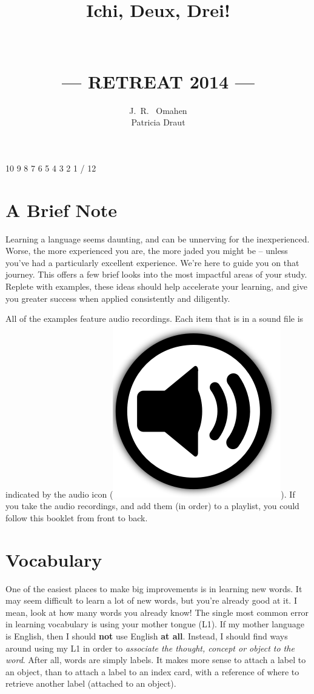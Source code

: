 \documentclass[letterpaper,twoside,openright,11pt,final]{memoir}
\title{
\vspace{24pt}
\large{\textbf{Ichi, Deux, Drei!} }\\
\HUGE{Learning}\\ 
\HUGE{a new language}\\
\vfill
\large{--- RETREAT 2014 ---}
\vfill
}
\author{J.~R.~ Omahen\\
Patricia Draut}
\date{}
\newcommand{\audio}{{\includegraphics[scale=0.05]{audio}}}
\begin{document}
\frontmatter

\thispagestyle{empty}
\begin{center}
\thetitle
\theauthor
\vfill
\end{center}
\newpage

\thispagestyle{empty}
\ccby

\vspace{\fill}
\begin{flushleft}\normalsize

10 9 8 7 6 5 4 3 2 1 / 12 \\
\end{flushleft}

\cleardoublepage
\frontmatter
\chapter{A Brief Note}

Learning a language seems daunting, and can be unnerving for the inexperienced. Worse, the more experienced you are, the more jaded you might be -- unless you've had a particularly excellent experience. We're here to guide you on that journey. This offers a few brief looks into the most impactful areas of your study. Replete with examples, these ideas should help accelerate your learning, and give you greater success when applied consistently and diligently.

All of the examples feature audio recordings. Each item that is in a sound file is indicated by the audio icon (\audio{}). If you take the audio recordings, and add them (in order) to a playlist, you could follow this booklet from front to back.



\mainmatter
\charis
\chapter{Vocabulary}

One of the easiest places to make big improvements is in learning new words. It may seem difficult to learn a lot of new words, but you're already good at it. I mean, look at how many words you already know! The single most common error in learning vocabulary is using your mother tongue (L1). If my mother language is English, then I should \textbf{not} use English \textbf{at all}. Instead, I should find ways around using my L1 in order to \textit{associate the thought, concept or object to the word}. After all, words are simply labels. It makes more sense to attach a label to an object, than to attach a label to an index card, with a reference of where to retrieve another label (attached to an object).
\end{document}
